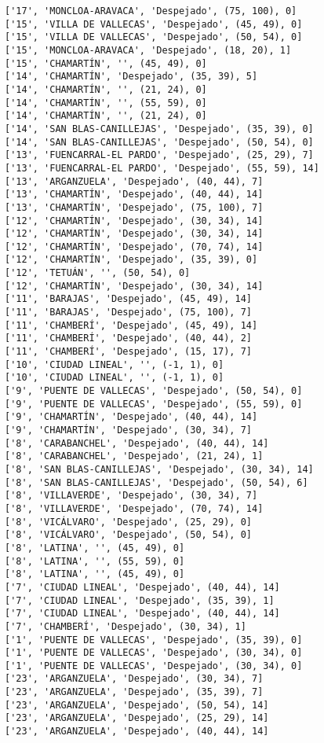\documentclass[11pt]{article}
\begin{document}
\begin{Verbatim}[commandchars=\\\{\}]
['17', 'MONCLOA-ARAVACA', 'Despejado', (75, 100), 0]
['15', 'VILLA DE VALLECAS', 'Despejado', (45, 49), 0]
['15', 'VILLA DE VALLECAS', 'Despejado', (50, 54), 0]
['15', 'MONCLOA-ARAVACA', 'Despejado', (18, 20), 1]
['15', 'CHAMARTÍN', '', (45, 49), 0]
['14', 'CHAMARTÍN', 'Despejado', (35, 39), 5]
['14', 'CHAMARTÍN', '', (21, 24), 0]
['14', 'CHAMARTÍN', '', (55, 59), 0]
['14', 'CHAMARTÍN', '', (21, 24), 0]
['14', 'SAN BLAS-CANILLEJAS', 'Despejado', (35, 39), 0]
['14', 'SAN BLAS-CANILLEJAS', 'Despejado', (50, 54), 0]
['13', 'FUENCARRAL-EL PARDO', 'Despejado', (25, 29), 7]
['13', 'FUENCARRAL-EL PARDO', 'Despejado', (55, 59), 14]
['13', 'ARGANZUELA', 'Despejado', (40, 44), 7]
['13', 'CHAMARTÍN', 'Despejado', (40, 44), 14]
['13', 'CHAMARTÍN', 'Despejado', (75, 100), 7]
['12', 'CHAMARTÍN', 'Despejado', (30, 34), 14]
['12', 'CHAMARTÍN', 'Despejado', (30, 34), 14]
['12', 'CHAMARTÍN', 'Despejado', (70, 74), 14]
['12', 'CHAMARTÍN', 'Despejado', (35, 39), 0]
['12', 'TETUÁN', '', (50, 54), 0]
['12', 'CHAMARTÍN', 'Despejado', (30, 34), 14]
['11', 'BARAJAS', 'Despejado', (45, 49), 14]
['11', 'BARAJAS', 'Despejado', (75, 100), 7]
['11', 'CHAMBERÍ', 'Despejado', (45, 49), 14]
['11', 'CHAMBERÍ', 'Despejado', (40, 44), 2]
['11', 'CHAMBERÍ', 'Despejado', (15, 17), 7]
['10', 'CIUDAD LINEAL', '', (-1, 1), 0]
['10', 'CIUDAD LINEAL', '', (-1, 1), 0]
['9', 'PUENTE DE VALLECAS', 'Despejado', (50, 54), 0]
['9', 'PUENTE DE VALLECAS', 'Despejado', (55, 59), 0]
['9', 'CHAMARTÍN', 'Despejado', (40, 44), 14]
['9', 'CHAMARTÍN', 'Despejado', (30, 34), 7]
['8', 'CARABANCHEL', 'Despejado', (40, 44), 14]
['8', 'CARABANCHEL', 'Despejado', (21, 24), 1]
['8', 'SAN BLAS-CANILLEJAS', 'Despejado', (30, 34), 14]
['8', 'SAN BLAS-CANILLEJAS', 'Despejado', (50, 54), 6]
['8', 'VILLAVERDE', 'Despejado', (30, 34), 7]
['8', 'VILLAVERDE', 'Despejado', (70, 74), 14]
['8', 'VICÁLVARO', 'Despejado', (25, 29), 0]
['8', 'VICÁLVARO', 'Despejado', (50, 54), 0]
['8', 'LATINA', '', (45, 49), 0]
['8', 'LATINA', '', (55, 59), 0]
['8', 'LATINA', '', (45, 49), 0]
['7', 'CIUDAD LINEAL', 'Despejado', (40, 44), 14]
['7', 'CIUDAD LINEAL', 'Despejado', (35, 39), 1]
['7', 'CIUDAD LINEAL', 'Despejado', (40, 44), 14]
['7', 'CHAMBERÍ', 'Despejado', (30, 34), 1]
['1', 'PUENTE DE VALLECAS', 'Despejado', (35, 39), 0]
['1', 'PUENTE DE VALLECAS', 'Despejado', (30, 34), 0]
['1', 'PUENTE DE VALLECAS', 'Despejado', (30, 34), 0]
['23', 'ARGANZUELA', 'Despejado', (30, 34), 7]
['23', 'ARGANZUELA', 'Despejado', (35, 39), 7]
['23', 'ARGANZUELA', 'Despejado', (50, 54), 14]
['23', 'ARGANZUELA', 'Despejado', (25, 29), 14]
['23', 'ARGANZUELA', 'Despejado', (40, 44), 14]

\end{Verbatim}
\end{document}
